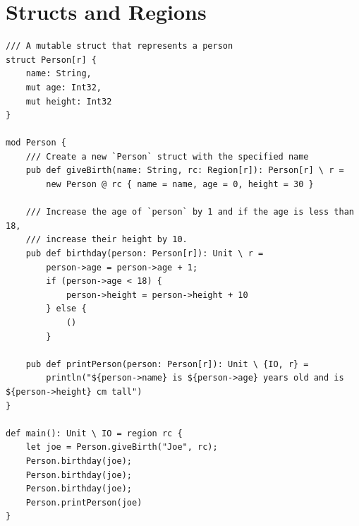\documentclass{article}
\begin{document}
\section{Structs and Regions}

\begin{lstlisting}
/// A mutable struct that represents a person
struct Person[r] {
    name: String,
    mut age: Int32,
    mut height: Int32
}

mod Person {
    /// Create a new `Person` struct with the specified name
    pub def giveBirth(name: String, rc: Region[r]): Person[r] \ r =
        new Person @ rc { name = name, age = 0, height = 30 }

    /// Increase the age of `person` by 1 and if the age is less than 18,
    /// increase their height by 10.
    pub def birthday(person: Person[r]): Unit \ r =
        person->age = person->age + 1;
        if (person->age < 18) {
            person->height = person->height + 10
        } else {
            ()
        }

    pub def printPerson(person: Person[r]): Unit \ {IO, r} =
        println("${person->name} is ${person->age} years old and is ${person->height} cm tall")
}

def main(): Unit \ IO = region rc {
    let joe = Person.giveBirth("Joe", rc);
    Person.birthday(joe);
    Person.birthday(joe);
    Person.birthday(joe);
    Person.printPerson(joe)
}
\end{lstlisting}
\end{document}
